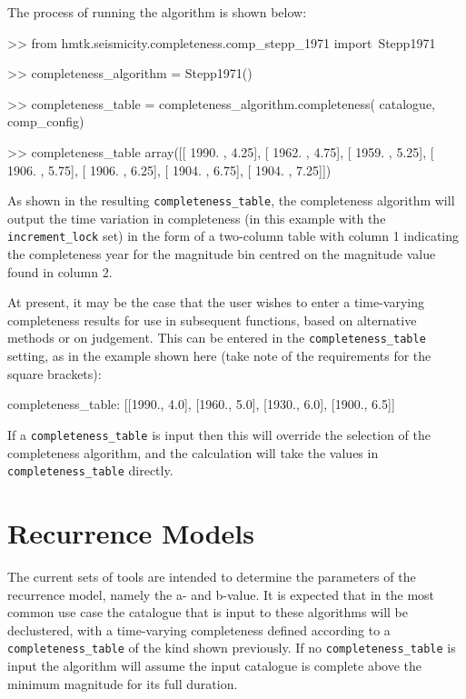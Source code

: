 The process of running the algorithm is shown below:

\begin{python}[frame=single]
>> from hmtk.seismicity.completeness.comp_stepp_1971 import\
    Stepp1971

>> completeness_algorithm = Stepp1971()

>> completeness_table = completeness_algorithm.completeness(
    catalogue,
    comp_config)

>> completeness_table 
array([[ 1990.  ,     4.25],
       [ 1962.  ,     4.75],
       [ 1959.  ,     5.25],
       [ 1906.  ,     5.75],
       [ 1906.  ,     6.25],
       [ 1904.  ,     6.75],
       [ 1904.  ,     7.25]])
\end{python}

As shown in the resulting \verb=completeness_table=, the completeness algorithm will output the time variation in completeness (in this example with the \verb=increment_lock= set) in the form of a two-column table with column 1 indicating the completeness year for the magnitude bin centred on the magnitude value found in column 2.

At present, it may be the case that the user wishes to enter a time-varying completeness results for use in subsequent functions, based on alternative methods or on judgement. This can be entered in the \verb=completeness_table= setting, as in the example shown here (take note of the requirements for the square brackets):

\begin{python}[frame=single]
completeness_table: [[1990., 4.0],
                     [1960., 5.0],
                     [1930., 6.0],
                     [1900., 6.5]]
\end{python}

If a \verb=completeness_table= is input then this will override the selection of the completeness algorithm, and the calculation will take the values in \verb=completeness_table= directly. 


\section{Recurrence Models}

The current sets of tools are intended to determine the parameters of the \textcite{GutenbergRichter1944} recurrence model, namely the a- and b-value. It is expected that in the most common use case the catalogue that is input to these algorithms will be declustered, with a time-varying completeness defined according to a \verb=completeness_table= of the kind shown previously. If no \verb=completeness_table= is input the algorithm will assume the input catalogue is complete above the minimum magnitude for its full duration.

